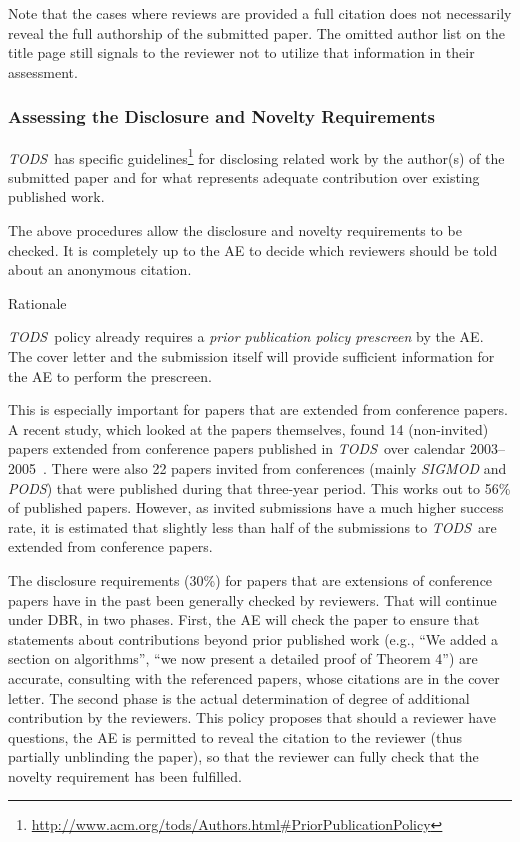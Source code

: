 \documentclass[acmtods,acmnow]{acmtrans2m}
\newcommand{\tods}{{\em TODS\/}}
\begin{document}
Note that the cases where reviews are provided a full citation does not
necessarily reveal the full authorship of the submitted paper. The omitted
author list on the title page still signals to the reviewer not to utilize
that information in their assessment.

\subsubsection{Assessing the Disclosure and Novelty Requirements}\label{sec:assessing}

\tods\ has specific
guidelines\footnote{\url{http://www.acm.org/tods/Authors.html#PriorPublicationPolicy}}
for disclosing related work by the author(s)
of the submitted paper and for what represents adequate contribution over
existing published work.

The above procedures allow the disclosure and novelty requirements to be
checked. It is completely up to the AE to decide which reviewers should be
told about an anonymous citation.

\pagebreak

\noindent
{\sffamily Rationale}

\tods\ policy already requires a {\em prior publication policy prescreen}
by the AE.
The cover letter and the submission itself will provide
sufficient information for the AE to perform the prescreen.

This is especially important for papers that are extended from conference
papers. A recent study, which looked at the papers themselves, found 14
(non-invited) papers extended from conference papers published in \tods\
over calendar 2003--2005~\cite{Montesi06}. There were also 22 papers invited
from conferences (mainly {\em SIGMOD} and {\em PODS}) that were published
during that three-year period. This works out to 56\% of published
papers. However, as invited submissions have a much higher success rate, it
is estimated that slightly less than half of the submissions to \tods\ are
extended from conference papers.

The disclosure requirements (30\%) for papers that are extensions of
conference papers have in the past been generally checked by reviewers. That
will continue under DBR, in two phases. First, the AE will check the paper
to ensure that statements about contributions beyond prior published work
(e.g., ``We added a section on algorithms'', ``we now present a detailed
proof of Theorem 4'') are accurate, consulting with the referenced papers,
whose citations are in the cover letter. The second phase is the actual
determination of degree of additional contribution by the reviewers. This
policy proposes that should a reviewer have questions, the AE is permitted
to reveal the citation to the 
reviewer (thus partially unblinding the paper), so that the reviewer can
fully check that the novelty requirement has been fulfilled.
\end{document}

